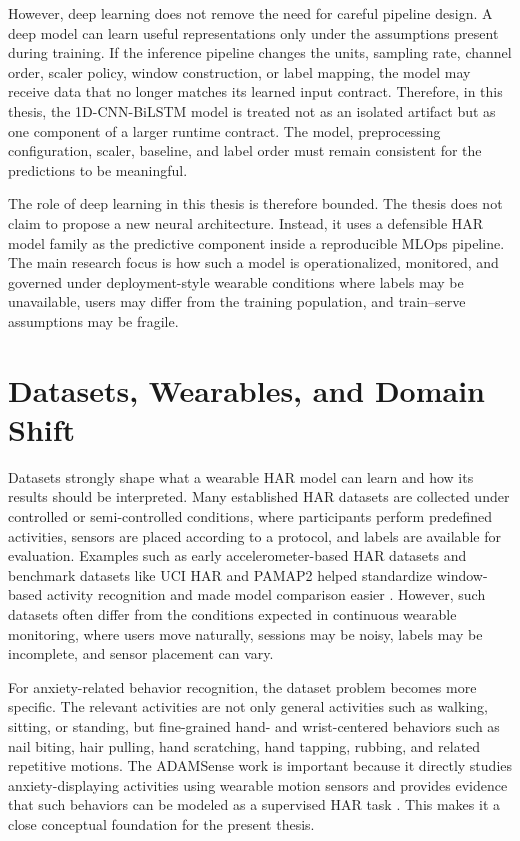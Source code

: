 However, deep learning does not remove the need for careful pipeline design. A deep model can learn useful representations only under the assumptions present during training. If the inference pipeline changes the units, sampling rate, channel order, scaler policy, window construction, or label mapping, the model may receive data that no longer matches its learned input contract. Therefore, in this thesis, the 1D-CNN-BiLSTM model is treated not as an isolated artifact but as one component of a larger runtime contract. The model, preprocessing configuration, scaler, baseline, and label order must remain consistent for the predictions to be meaningful.

The role of deep learning in this thesis is therefore bounded. The thesis does not claim to propose a new neural architecture. Instead, it uses a defensible HAR model family as the predictive component inside a reproducible MLOps pipeline. The main research focus is how such a model is operationalized, monitored, and governed under deployment-style wearable conditions where labels may be unavailable, users may differ from the training population, and train--serve assumptions may be fragile.

\section{Datasets, Wearables, and Domain Shift}

Datasets strongly shape what a wearable HAR model can learn and how its results should be interpreted. Many established HAR datasets are collected under controlled or semi-controlled conditions, where participants perform predefined activities, sensors are placed according to a protocol, and labels are available for evaluation. Examples such as early accelerometer-based HAR datasets and benchmark datasets like UCI HAR and PAMAP2 helped standardize window-based activity recognition and made model comparison easier \cite{bao2004activity,anguita2013esann,uciHar2013,reiss2012pamap}. However, such datasets often differ from the conditions expected in continuous wearable monitoring, where users move naturally, sessions may be noisy, labels may be incomplete, and sensor placement can vary.

For anxiety-related behavior recognition, the dataset problem becomes more specific. The relevant activities are not only general activities such as walking, sitting, or standing, but fine-grained hand- and wrist-centered behaviors such as nail biting, hair pulling, hand scratching, hand tapping, rubbing, and related repetitive motions. The ADAMSense work is important because it directly studies anxiety-displaying activities using wearable motion sensors and provides evidence that such behaviors can be modeled as a supervised HAR task \cite{khan2021adamsense}. This makes it a close conceptual foundation for the present thesis.

